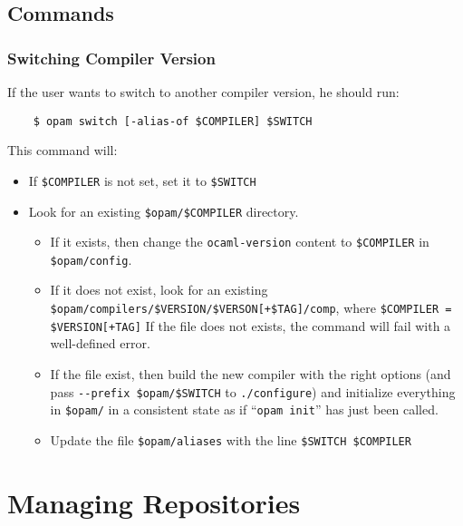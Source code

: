 \documentclass[a4paper,10pt]{article}
\begin{document}
\subsection{Commands}

\subsubsection{Switching Compiler Version}

If the user wants to switch to another compiler version, he should run:

\begin{verbatim}
    $ opam switch [-alias-of $COMPILER] $SWITCH
\end{verbatim}

This command will:

\begin{itemize}

\item If \verb+$COMPILER+ is not set, set it to \verb+$SWITCH+

\item Look for an existing \verb+$opam/$COMPILER+ directory.

\begin{itemize}
\item If it
  exists, then change the {\tt ocaml-version} content to
  \verb+$COMPILER+ in  \verb+$opam/config+.

\item If it does not exist, look for an existing
  \verb|$opam/compilers/$VERSION/$VERSON[+$TAG]/comp|, where
  \verb|$COMPILER = $VERSION[+TAG]| If the file does not exists, the
  command will fail with a well-defined error.

\item If the file exist, then build the new compiler with the right
  options (and pass \verb+--prefix $opam/$SWITCH+ to
  \verb+./configure+) and initialize everything in \verb+$opam/+
  in a consistent state as if ``\verb+opam init+'' has just been called.

\item Update the file \verb+$opam/aliases+ with the line
  \verb+$SWITCH $COMPILER+

\end{itemize}

\end{itemize}

\section{Managing Repositories}
\label{section:repositories}
\end{document}
